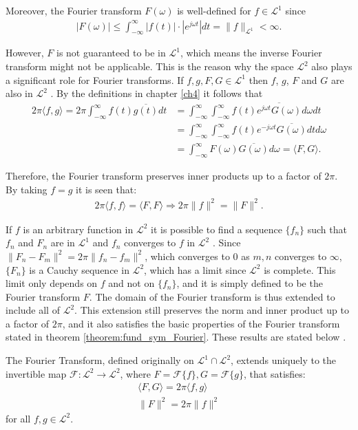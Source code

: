 Moreover, the Fourier transform $F(\omega)$ is well-defined for $f \in \mathcal{L}^1$ since
\begin{align*}
|F(\omega)| \leq \int_{-\infty}^\infty |f(t)| \cdot |e^{j \omega t}| dt = \|f\|_{\mathcal{L}^1} < \infty.
\end{align*}

However, $F$ is not guaranteed to be in $\mathcal{L}^1$, which means the inverse Fourier transform might not be applicable. This is the reason why the space $\mathcal{L}^2$ also plays a significant role for Fourier transforms. If $f, g, F, G \in \mathcal{L}^1$ then $f$, $g$, $F$ and $G$ are also in $\mathcal{L}^2$ \cite{page 219, FAA}. By the definitions in chapter \ref{ch4} it follows that
\begin{align*}
2\pi \langle f,g \rangle = 2\pi \int_{-\infty}^\infty f(t) \overline{g(t)} dt &= \int_{-\infty}^\infty \int_{-\infty}^\infty f(t) \overline{e^{j\omega t} G(\omega)} d\omega dt \\
&= \int_{-\infty}^\infty \int_{-\infty}^\infty f(t) e^{-j\omega t} \overline{G(\omega)} dt d\omega \\
&= \int_{-\infty}^\infty F(\omega) \overline{G(\omega)} d\omega = \langle F,G \rangle.
\end{align*}

Therefore, the Fourier transform preserves inner products up to a factor of $2\pi$. By taking $f = g$ it is seen that:
\begin{align*}
2\pi \langle f,f \rangle = \langle F,F \rangle \Rightarrow 2\pi \|f\|^2 = \|F\|^2.
\end{align*}

If $f$ is an arbitrary function in $\mathcal{L}^2$ it is possible to find a sequence $\{f_n\}$ such that $f_n$ and $F_n$ are in $\mathcal{L}^1$ and $f_n$ converges to $f$ in $\mathcal{L}^2$ \cite{page 82, FAA}. Since $\|F_n - F_m\|^2 = 2\pi\|f_n - f_m\|^2$, which converges to 0 as $m,n$ converges to $\infty$, $\{F_n\}$ is a Cauchy sequence in $\mathcal{L}^2$, which has a limit since $\mathcal{L}^2$ is complete. This limit only depends on $f$ and not on $\{f_n\}$, and it is simply defined to be the Fourier transform $F$. The domain of the Fourier transform is thus extended to include all of $\mathcal{L}^2$. This extension still preserves the norm and inner product up to a factor of $2\pi$, and it also satisfies the basic properties of the Fourier transform stated in theorem \ref{theorem:fund_sym_Fourier}. These results are stated below \cite{page 222, FAA}.

\begin{theorem} \label{Plancherel}
The Fourier Transform, defined originally on $\mathcal{L}^1 \cap \mathcal{L}^2$, extends uniquely to the invertible map $\mathcal{F}: \mathcal{L}^2 \to \mathcal{L}^2$, where $F = \mathcal{F}\{f\}, G = \mathcal{F}\{g\}$, that satisfies:
\begin{align*}
\langle F, G \rangle = 2\pi \langle f,g \rangle \\
\|F\|^2  = 2\pi \|f\|^2
\end{align*}
for all $f,g \in \mathcal{L}^2$.
\end{theorem}